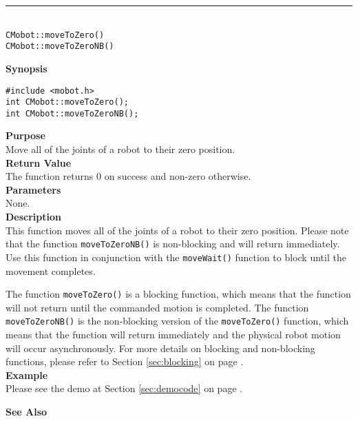 \noindent
\vspace{5pt}
\rule{4.5in}{0.015in}\\
\noindent
{\LARGE \texttt{CMobot::moveToZero()}}\\
{\LARGE \texttt{CMobot::moveToZeroNB()}}\\
{}

\noindent
{\bf Synopsis}
\vspace{-8pt}
\begin{verbatim}
#include <mobot.h>
int CMobot::moveToZero();
int CMobot::moveToZeroNB();
\end{verbatim}

\noindent
{\bf Purpose}\\
Move all of the joints of a robot to their zero position.\\

\noindent
{\bf Return Value}\\
The function returns 0 on success and non-zero otherwise.\\

\noindent
{\bf Parameters}\\
None.\\

\noindent
{\bf Description}\\
This function moves all of the joints of a robot to their zero position.
Please note that the function \texttt{moveToZeroNB()} is non-blocking and will return immediately. Use
this function in conjunction with the \texttt{moveWait()} function to block
until the movement completes.

The function \texttt{moveToZero()} is a blocking function, which means that 
the function will not return until the commanded motion is 
completed. The function \texttt{moveToZeroNB()} is the non-blocking version of
the \texttt{moveToZero()} function, which means that the function will return
immediately and the physical robot motion will occur asynchronously. For
more details on blocking and non-blocking functions, please refer to 
Section \ref{sec:blocking} on page \pageref{sec:blocking}.\\

\noindent
{\bf Example}\\
Please see the demo at Section \ref{sec:democode} on page \pageref{sec:democode}.\\
\noindent

\noindent
{\bf See Also}\\


